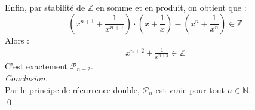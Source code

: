 \documentclass[10pt]{article}
\begin{document}
\begin{tcolorbox}[enhanced, width=7in, center, size=fbox, fontupper=\large, drop shadow southwest]
    Enfin, par stabilité de $\mathbb{Z}$ en somme et en produit, on obtient que :
    \begin{equation*}
        (x^{n+1}+\frac{1}{x^{n+1}})\cdot(x+\frac{1}{x})-(x^n+\frac{1}{x^n})\in\mathbb{Z}
    \end{equation*}
    Alors :
    \begin{align*}
        x^{n+2} + \frac{1}{x^{n+2}} \in \mathbb{Z}
    \end{align*}
    C'est exactement $\mathcal{P}_{n+2}$.\\
    \emph{Conclusion.}\\
    Par le principe de récurrence double, $\mathcal{P}_n$ est vraie pour tout $n\in\mathbb{N}$.\\
    \qed
\end{tcolorbox}
\end{document}

